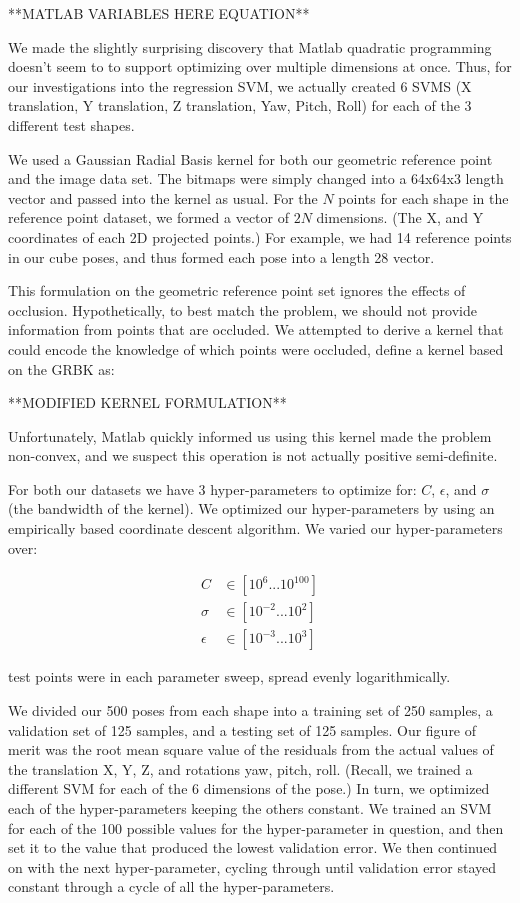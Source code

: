 \documentclass[journal]{IEEEtran}
\begin{document}
**MATLAB VARIABLES HERE EQUATION**

We made the slightly surprising discovery that Matlab quadratic programming doesn't seem to to support optimizing over multiple dimensions at once. Thus, for our investigations into the regression SVM, we actually created 6 SVMS (X translation, Y translation, Z translation, Yaw, Pitch, Roll) for each of the 3 different test shapes.

We used a Gaussian Radial Basis kernel for both our geometric reference point and the image data set. The bitmaps were simply changed into a 64x64x3 length vector and passed into the kernel as usual. For the $N$ points for each shape in the reference point dataset, we formed a vector of $2N$ dimensions. (The X, and Y coordinates of each 2D projected points.)  For example, we had 14 reference points in our cube poses, and thus formed each pose into a length 28 vector.

This formulation on the geometric reference point set ignores the effects of occlusion. Hypothetically, to best match the problem, we should not provide information from points that are occluded. We attempted to derive a kernel that could encode the knowledge of which points were occluded, define a kernel based on the GRBK as:

**MODIFIED KERNEL FORMULATION**

Unfortunately, Matlab quickly informed us using this kernel made the problem non-convex, and we suspect this operation is not actually positive semi-definite.

For both our datasets we have 3 hyper-parameters to optimize for: $C$, $\epsilon$, and $\sigma$ (the bandwidth of the kernel). We optimized our hyper-parameters by using an empirically based coordinate descent algorithm. We varied our hyper-parameters over:

\begin{align*}
C &\in [10^{6} ... 10^{100}]\\
\sigma &\in [10^{-2} ... 10^{2}]\\
\epsilon &\in [10^{-3} ... 10^{3}]
\end{align*}

 test points were in each parameter sweep, spread evenly logarithmically.

We divided our 500 poses from each shape into a training set of 250 samples, a validation set of 125 samples, and a testing set of 125 samples. Our figure of merit was the root mean square value of the residuals from the actual values of the translation X, Y, Z, and rotations yaw, pitch, roll. (Recall, we trained a different SVM for each of the 6 dimensions of the pose.) In turn, we optimized each of the hyper-parameters keeping the others constant. We trained an SVM for each of the 100 possible values for the hyper-parameter in question, and then set it to the value that produced the lowest validation error. We then continued on with the next hyper-parameter, cycling through until validation error stayed constant through a cycle of all the hyper-parameters.
\end{document}
